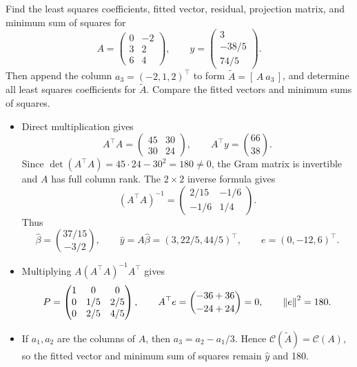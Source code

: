 \begin{example}\label{example:06:least-squares}
Find the least squares coefficients, fitted vector, residual, projection
matrix, and minimum sum of squares for
\[
A=\begin{pmatrix}0&-2\\3&2\\6&4\end{pmatrix},\qquad
y=\begin{pmatrix}3\\-38/5\\74/5\end{pmatrix}.
\]
Then append the column \(a_3=(-2,1,2)^\top\) to form
\(\widetilde A=[\,A\ a_3\,]\), and determine all least squares coefficients
for \(\widetilde A\). Compare the fitted vectors and minimum sums of squares.
\par\smallskip
{}
\begin{itemize}
\item Direct multiplication gives
  \[
  A^\top A=\begin{pmatrix}45&30\\30&24\end{pmatrix},\qquad
  A^\top y=\binom{66}{38}.
  \]
  Since \(\det(A^\top A)=45\cdot24-30^2=180\ne0\), the Gram matrix
  is invertible and \(A\) has full column rank. The \(2\times2\) inverse
  formula gives
  \[
  (A^\top A)^{-1}=\begin{pmatrix}2/15&-1/6\\-1/6&1/4\end{pmatrix}.
  \]
  Thus
  \[
  \hat\beta=\binom{37/15}{-3/2},\qquad
  \hat y=A\hat\beta=(3,22/5,44/5)^\top,
  \qquad e=(0,-12,6)^\top.
  \]
\item Multiplying \(A(A^\top A)^{-1}A^\top\) gives
  \[
  P=\begin{pmatrix}1&0&0\\0&1/5&2/5\\0&2/5&4/5\end{pmatrix},\qquad
  A^\top e=\binom{-36+36}{-24+24}=0,\qquad \left\lVert e\right\rVert^2=180.
  \]
\end{itemize}
\begin{itemize}
\item If \(a_1,a_2\) are the columns of \(A\), then
  \(a_3=a_2-a_1/3\). Hence \(\mathcal C(\widetilde A)=\mathcal C(A)\),
  so the fitted vector and minimum sum of squares remain \(\hat y\) and 180.

\end{itemize}
\end{example}
